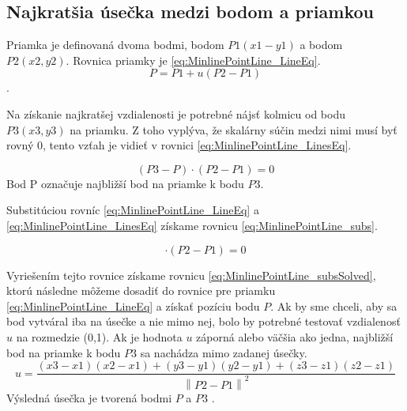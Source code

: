 \subsection*{Najkratšia úsečka medzi bodom a priamkou}\label{sec:najkratsiauseckaBP}
Priamka je definovaná dvoma bodmi, bodom $P1(x1-y1)$ a bodom $P2(x2,y2)$. 
Rovnica priamky je \ref{eq:MinlinePointLine_LineEq}.
\begin{equation}
    P = P1 + u(P2-P1)
    \label{eq:MinlinePointLine_LineEq}
\end{equation}. 

Na získanie najkratšej vzdialenosti je potrebné nájsť kolmicu od bodu $P3(x3,y3)$ na priamku. Z toho vyplýva, že skalárny súčin medzi nimi musí byť rovný 0, tento vzťah je vidieť v rovnici \ref{eq:MinlinePointLine_LinesEq}.

\begin{equation}
    (P3-P)\cdot(P2-P1) =0 
    \label{eq:MinlinePointLine_LinesEq}
\end{equation}
Bod P označuje najbližší bod na priamke k bodu $P3$.

Substitúciou rovníc \ref{eq:MinlinePointLine_LineEq} a \ref{eq:MinlinePointLine_LinesEq} získame rovnicu \ref{eq:MinlinePointLine_subs}.

\begin{equation}
[P3 - P1 - u(P2-P1)] \cdot (P2 - P1) = 0
    \label{eq:MinlinePointLine_subs}
\end{equation}

Vyriešením tejto rovnice získame rovnicu \ref{eq:MinlinePointLine_subsSolved}, ktorú následne môžeme dosadiť do rovnice pre priamku \ref{eq:MinlinePointLine_LineEq} a získať pozíciu bodu $P$. Ak by sme chceli, aby sa bod vytváral iba na úsečke a nie mimo nej, bolo by potrebné testovať vzdialenosť $u$ na rozmedzie (0,1). Ak je hodnota $u$ záporná alebo väčšia ako jedna,  najbližší bod na priamke k bodu $P3$ sa nachádza mimo zadanej úsečky. 
\begin{equation}
u= \frac
{\left (x3 -x1  \right )\left (x2-x1  \right )
+\left (y3-y1  \right )\left (y2-y1  \right )
+\left (z3-z1  \right )\left (z2-z1  \right )}
{\left \| P2-P1 \right \|^{2}}
    \label{eq:MinlinePointLine_subsSolved}
\end{equation}
Výsledná úsečka je tvorená bodmi $P$ a $P3$ \cite{bourke_Point_Line_Plane}.



